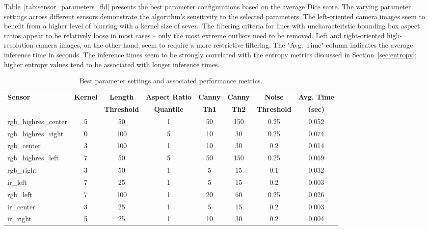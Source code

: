 \documentclass[Master,MDS,english]{BASE/twbook} %
\begin{document}
Table~\ref{tab:sensor_parameters_fld} presents the best parameter configurations based on the average Dice score. The varying parameter settings across different sensors demonstrate the algorithm's sensitivity to the selected parameters.
The left-oriented camera images seem to benefit from a higher level of blurring with a kernel size of seven. 
The filtering criteria for lines with uncharacteristic bounding box aspect ratios appear to be relatively loose in most cases -- only the most extreme outliers need to be removed. Left and right-oriented high-resolution camera images, on the other hand, seem to require a more restrictive filtering. 
The "Avg. Time" column indicates the average inference time in seconds. The inference times seem to be strongly correlated with the entropy metrics discussed in Section~\ref{sec:entropy}; higher entropy values tend to be associated with longer inference times.


\begin{table}[htbp]
\footnotesize
    \centering
    \begin{tabular}{|l|c|c|c|c|c|c|c|}
        \hline
        \textbf{Sensor} & \textbf{Kernel} & \textbf{Length}  & \textbf{Aspect Ratio } & \textbf{Canny } & \textbf{Canny } & \textbf{Noise} & \textbf{Avg. Time } \\
         &  & \textbf{Threshold} & \textbf{Quantile} & \textbf{Th1} & \textbf{Th2} & \textbf{Threshold} & \textbf{(sec)} \\
        \hline
        rgb\_highres\_center & 5 & 50 & 1 & 50 & 150 & 0.25 & 0.052 \\
        rgb\_highres\_right & 0 & 100 & 5 & 10 & 30 & 0.25 & 0.074 \\
        rgb\_center & 3 & 100 & 1 & 10 & 30 & 0.2 & 0.014 \\
        rgb\_highres\_left & 7 & 50 & 5 & 50 & 150 & 0.25 & 0.069 \\
        rgb\_right & 3 & 50 & 1 & 5 & 15 & 0.1 & 0.032 \\
        ir\_left & 7 & 25 & 1 & 5 & 15 & 0.2 & 0.003 \\
        rgb\_left & 7 & 100 & 1 & 20 & 60 & 0.25 & 0.026 \\
        ir\_center & 3 & 25 & 1 & 5 & 15 & 0.2 & 0.003 \\
        ir\_right & 5 & 25 & 1 & 10 & 30 & 0.2 & 0.004 \\
        \hline
    \end{tabular}
      \caption{Best parameter settings and associated performance metrics.}
    \label{tab:sensor_parameters}
\end{table}
\end{document}
